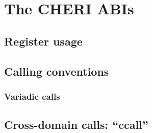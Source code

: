 \chapter{The CHERI ABIs}
\label{chp:abis}

\section{Register usage}
\section{Calling conventions}
\subsection{Variadic calls}
\section{Cross-domain calls: ``ccall''}
